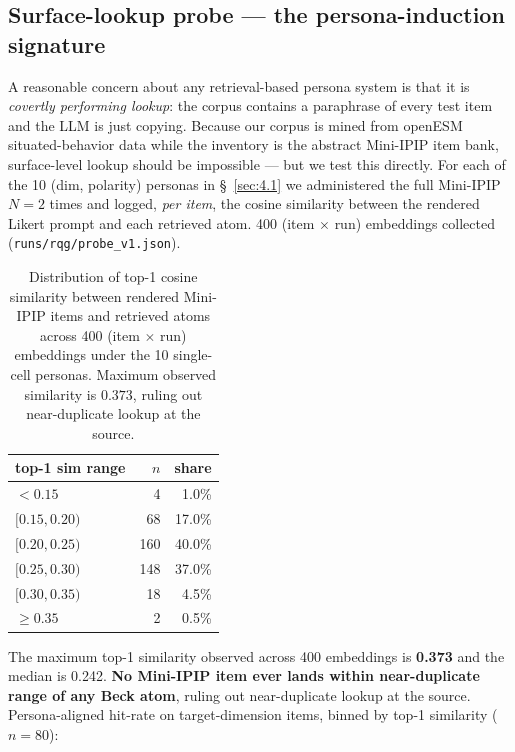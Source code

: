 \subsection{Surface-lookup probe --- the persona-induction signature}
\label{app:B.2}

A reasonable concern about any retrieval-based persona system is that it is \textit{covertly performing lookup}: the corpus contains a paraphrase of every test item and the LLM is just copying. Because our corpus is mined from openESM situated-behavior data while the inventory is the abstract Mini-IPIP item bank, surface-level lookup should be impossible --- but we test this directly. For each of the 10 (dim, polarity) personas in \S~\ref{sec:4.1} we administered the full Mini-IPIP $N=2$ times and logged, \textit{per item}, the cosine similarity between the rendered Likert prompt and each retrieved atom. 400 (item $\times$ run) embeddings collected (\texttt{runs/\allowbreak{}rqg/\allowbreak{}probe\_\allowbreak{}v1.json}).

\begin{table}[t]
\centering\small
\begin{tabular}{lrr}
\toprule
top-1 sim range & $n$ & share \\
\midrule
$< 0.15$ & 4 & 1.0\% \\
$[0.15, 0.20)$ & 68 & 17.0\% \\
$[0.20, 0.25)$ & 160 & 40.0\% \\
$[0.25, 0.30)$ & 148 & 37.0\% \\
$[0.30, 0.35)$ & 18 & 4.5\% \\
$\geq 0.35$ & 2 & 0.5\% \\
\bottomrule
\end{tabular}
\caption{Distribution of top-1 cosine similarity between rendered Mini-IPIP items and retrieved atoms across 400 (item $\times$ run) embeddings under the 10 single-cell personas. Maximum observed similarity is $0.373$, ruling out near-duplicate lookup at the source.}
\label{tab:lookup-sim-dist}
\end{table}

The maximum top-1 similarity observed across 400 embeddings is \textbf{0.373} and the median is 0.242. \textbf{No Mini-IPIP item ever lands within near-duplicate range of any Beck atom}, ruling out near-duplicate lookup at the source. Persona-aligned hit-rate on target-dimension items, binned by top-1 similarity ($n=80$):

